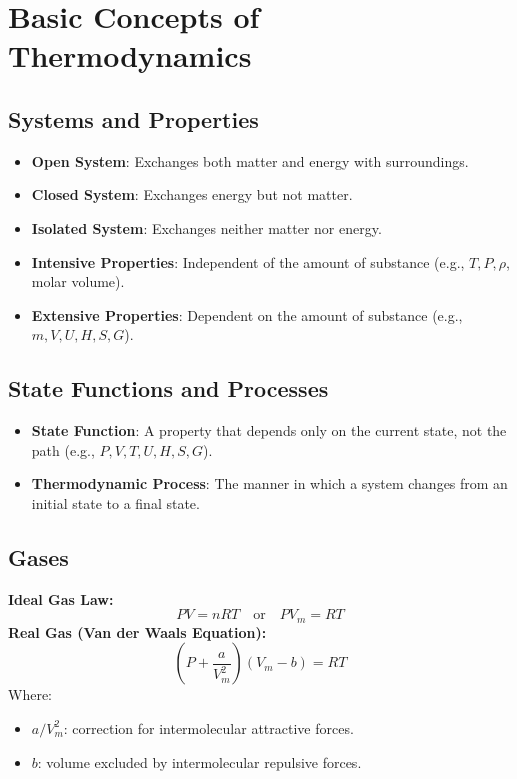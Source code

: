 \section{Basic Concepts of Thermodynamics}

\subsection{Systems and Properties}
\begin{itemize}
    \item \textbf{Open System}: Exchanges both matter and energy with surroundings.
    \item \textbf{Closed System}: Exchanges energy but not matter.
    \item \textbf{Isolated System}: Exchanges neither matter nor energy.
    \item \textbf{Intensive Properties}: Independent of the amount of substance (e.g., $T, P, \rho$, molar volume).
    \item \textbf{Extensive Properties}: Dependent on the amount of substance (e.g., $m, V, U, H, S, G$).
\end{itemize}

\subsection{State Functions and Processes}
\begin{itemize}
    \item \textbf{State Function}: A property that depends only on the current state, not the path (e.g., $P, V, T, U, H, S, G$).
    \item \textbf{Thermodynamic Process}: The manner in which a system changes from an initial state to a final state.
\end{itemize}

\subsection{Gases}
\textbf{Ideal Gas Law:}
\begin{equation}
    PV = nRT \quad \text{or} \quad PV_m = RT
\end{equation}
\textbf{Real Gas (Van der Waals Equation):}
\begin{equation}
    \left( P + \frac{a}{V_m^2} \right)(V_m - b) = RT
\end{equation}
Where:
\begin{itemize}
    \item $a/V_m^2$: correction for intermolecular attractive forces.
    \item $b$: volume excluded by intermolecular repulsive forces.
\end{itemize}

